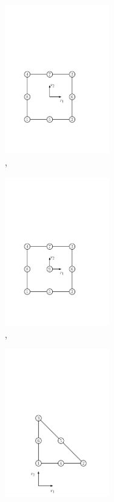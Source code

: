 \begin{figure}[htb]
\begin{subfigure}{0.5\textwidth}
    \includegraphics[width=0.5\textwidth]{quadrangle8r}
    \caption{, }
    \label{fig:EL:SURFLOAD:QUADRANGLE8R}
  \end{subfigure}
  \begin{subfigure}{0.5\textwidth}
    \centering
    \includegraphics[width=0.5\textwidth]{quadrangle9}
    \caption{, }
    \label{fig:EL:SURFLOAD:QUADRANGLE9}
  \end{subfigure}
  \begin{subfigure}{0.5\textwidth}
    \centering
    \includegraphics[width=0.5\textwidth]{triangle6h}

\end{subfigure}
\end{figure}
